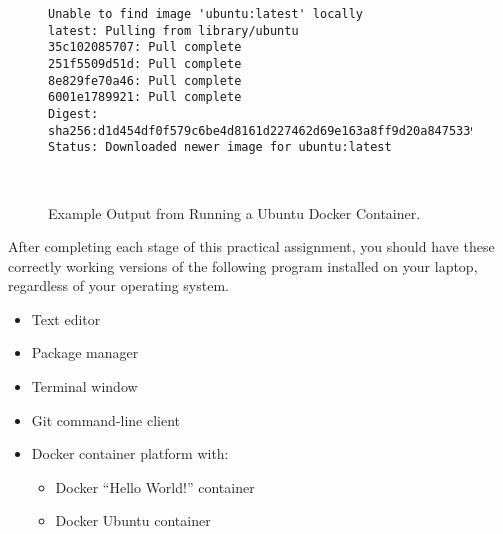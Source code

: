 \documentclass[11pt]{article}
\begin{document}
\begin{figure}

\begin{verbatim}
Unable to find image 'ubuntu:latest' locally
latest: Pulling from library/ubuntu
35c102085707: Pull complete
251f5509d51d: Pull complete
8e829fe70a46: Pull complete
6001e1789921: Pull complete
Digest: sha256:d1d454df0f579c6be4d8161d227462d69e163a8ff9d20a847533989cf0c94d90
Status: Downloaded newer image for ubuntu:latest
\end{verbatim}

\vspace*{-.25in}
\caption{Example Output from Running a Ubuntu Docker Container.}~\label{fig:ubuntu}
\vspace*{-.25in}
\end{figure}

\vspace*{-.05in}

After completing each stage of this practical assignment, you should have these
correctly working versions of the following program installed on your laptop,
regardless of your operating system.

\vspace*{-.05in}

\begin{itemize}
  \setlength{\itemsep}{0pt}

  \item Text editor

  \item Package manager

  \item Terminal window

  \item Git command-line client

  \item Docker container platform with:

    \vspace*{-.1in}
    \begin{itemize}
      \setlength{\itemsep}{0pt}

      \item Docker ``Hello World!'' container
      \item Docker Ubuntu container

    \end{itemize}

\end{itemize}

\vspace*{-.1in}
\end{document}

